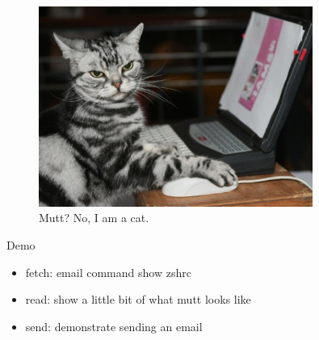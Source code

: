 \begin{frame}[t]{}
\begin{figure}
    \centering
    \includegraphics[width = 0.8\textwidth]{./catComputer.jpg}
    \caption[font=small]{Mutt? No, I am a cat.}
  \end{figure}
\end{frame}

\begin{frame}[t]{Demo}
\begin{itemize}
    \item fetch: email command show zshrc
    \item read: show a little bit of what mutt looks like
    \item send: demonstrate sending an email
\end{itemize}
\end{frame}

